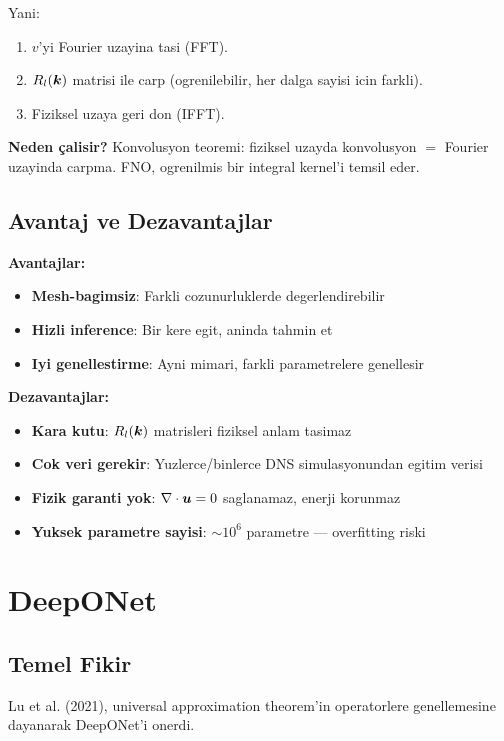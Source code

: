Yani:
\begin{enumerate}
\item $v$'yi Fourier uzayina tasi (FFT).
\item $R_l(\bm{k})$ matrisi ile carp (ogrenilebilir, her dalga sayisi icin farkli).
\item Fiziksel uzaya geri don (IFFT).
\end{enumerate}

\textbf{Neden çalisir?} Konvolusyon teoremi: fiziksel uzayda konvolusyon $=$ Fourier uzayinda carpma. FNO, ogrenilmis bir integral kernel'i temsil eder.

\subsection{Avantaj ve Dezavantajlar}

\textbf{Avantajlar:}
\begin{itemize}
\item \textbf{Mesh-bagimsiz}: Farkli cozunurluklerde degerlendirebilir
\item \textbf{Hizli inference}: Bir kere egit, aninda tahmin et
\item \textbf{Iyi genellestirme}: Ayni mimari, farkli parametrelere genellesir
\end{itemize}

\textbf{Dezavantajlar:}
\begin{itemize}
\item \textbf{Kara kutu}: $R_l(\bm{k})$ matrisleri fiziksel anlam tasimaz
\item \textbf{Cok veri gerekir}: Yuzlerce/binlerce DNS simulasyonundan egitim verisi
\item \textbf{Fizik garanti yok}: $\nabla \cdot\bm{u} = 0$ saglanamaz, enerji korunmaz
\item \textbf{Yuksek parametre sayisi}: $\sim 10^6$ parametre --- overfitting riski
\end{itemize}


\section{DeepONet}
\label{sec:deeponet}

\subsection{Temel Fikir}

Lu et al. (2021), universal approximation theorem'in operatorlere genellemesine dayanarak DeepONet'i onerdi.


